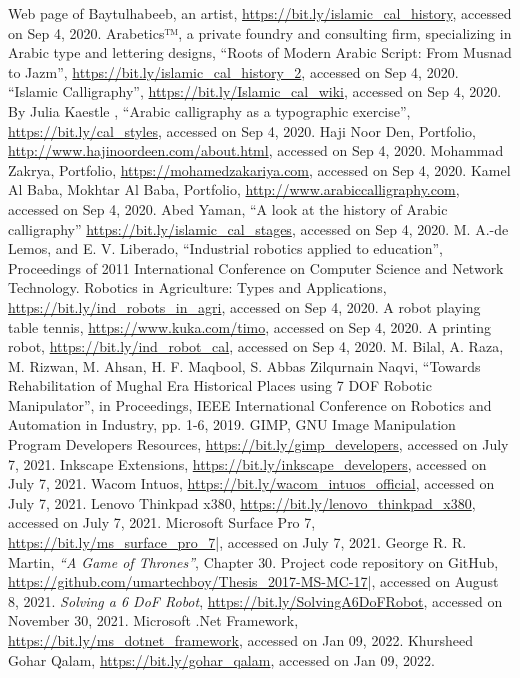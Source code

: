 \begin{thebibliography}{99}
 Web page of Baytulhabeeb, an artist, \url{https://bit.ly/islamic_cal_history}, accessed on Sep 4, 2020.
 Arabetics™, a private foundry and consulting firm, specializing in Arabic type and lettering designs, “Roots of Modern Arabic Script:  From Musnad to Jazm”, \url{https://bit.ly/islamic_cal_history_2}, accessed on Sep 4, 2020.
 “Islamic Calligraphy”, \url{https://bit.ly/Islamic_cal_wiki}, accessed on Sep 4, 2020.
 By Julia Kaestle , “Arabic calligraphy as a typographic exercise”, \url{https://bit.ly/cal_styles}, accessed on Sep 4, 2020.
 Haji Noor Den, Portfolio, \url{http://www.hajinoordeen.com/about.html}, accessed on Sep 4, 2020.
 Mohammad Zakrya, Portfolio, \url{https://mohamedzakariya.com}, accessed on Sep 4, 2020.
 Kamel Al Baba, Mokhtar Al Baba, Portfolio, \url{http://www.arabiccalligraphy.com}, accessed on Sep 4, 2020.
 Abed Yaman, “A look at the history of Arabic calligraphy” \url{https://bit.ly/islamic_cal_stages}, accessed on Sep 4, 2020.
 M. A.-de Lemos, and E. V. Liberado, “Industrial robotics applied to education”, Proceedings of 2011 International Conference on Computer Science and Network Technology.
 Robotics in Agriculture: Types and Applications, \url{https://bit.ly/ind_robots_in_agri}, accessed on Sep 4, 2020.
 A robot playing table tennis, \url{https://www.kuka.com/timo}, accessed on Sep 4, 2020.
 A printing robot, \url{https://bit.ly/ind_robot_cal}, accessed on Sep 4, 2020.
 M. Bilal, A. Raza, M. Rizwan, M. Ahsan, H. F. Maqbool, S. Abbas Zilqurnain Naqvi, “Towards Rehabilitation of Mughal Era Historical Places using 7 DOF Robotic Manipulator”, in Proceedings, IEEE International Conference on Robotics and Automation in Industry, pp. 1-6, 2019.
 GIMP, GNU Image Manipulation Program Developers Resources, \url{https://bit.ly/gimp_developers}, accessed on July 7, 2021.
 Inkscape Extensions, \url{https://bit.ly/inkscape_developers}, accessed on July 7, 2021.
 Wacom Intuos, \url{https://bit.ly/wacom_intuos_official}, accessed on July 7, 2021.
 Lenovo Thinkpad x380, \url{https://bit.ly/lenovo_thinkpad_x380}, accessed on July 7, 2021.
 Microsoft Surface Pro 7, \url{https://bit.ly/ms_surface_pro_7}|, accessed on July 7, 2021.
 George R. R. Martin, \emph{``A Game of Thrones''}, Chapter $30$.
 Project code repository on GitHub, \url{https://github.com/umartechboy/Thesis_2017-MS-MC-17}|, accessed on August 8, 2021.
 \emph{Solving a 6 DoF Robot}, \url{https://bit.ly/SolvingA6DoFRobot}, accessed on November 30, 2021.
 Microsoft .Net Framework, \url{https://bit.ly/ms_dotnet_framework}, accessed on Jan 09, 2022.
 Khursheed Gohar Qalam, \url{https://bit.ly/gohar_qalam}, accessed on Jan 09, 2022.
    \end{thebibliography} 